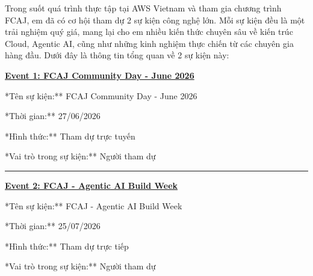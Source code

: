 Trong suốt quá trình thực tập tại AWS Vietnam và tham gia chương trình
FCAJ, em đã có cơ hội tham dự 2 sự kiện công nghệ lớn. Mỗi sự kiện đều
là một trải nghiệm quý giá, mang lại cho em nhiều kiến thức chuyên sâu
về kiến trúc Cloud, Agentic AI, cũng như những kinh nghiệm thực chiến từ
các chuyên gia hàng đầu. Dưới đây là thông tin tổng quan về 2 sự kiện
này:

\vspace{0.5em}\noindent\textbf{\texorpdfstring{\href{4.1-Event1/}{Event 1: FCAJ
Community Day - June 2026}}{Event 1: FCAJ Community Day - June 2026}}

\qquad **Tên sự kiện:** FCAJ Community Day - June 2026

\qquad **Thời gian:** 27/06/2026

\qquad **Hình thức:** Tham dự trực tuyến

\qquad **Vai trò trong sự kiện:** Người tham dự

\begin{center}\rule{0.5\linewidth}{0.5pt}\end{center}

\vspace{0.5em}\noindent\textbf{\texorpdfstring{\href{4.2-Event2/}{Event 2: FCAJ -
Agentic AI Build Week}}{Event 2: FCAJ - Agentic AI Build Week}}

\qquad **Tên sự kiện:** FCAJ - Agentic AI Build Week

\qquad **Thời gian:** 25/07/2026

\qquad **Hình thức:** Tham dự trực tiếp

\qquad **Vai trò trong sự kiện:** Người tham dự
